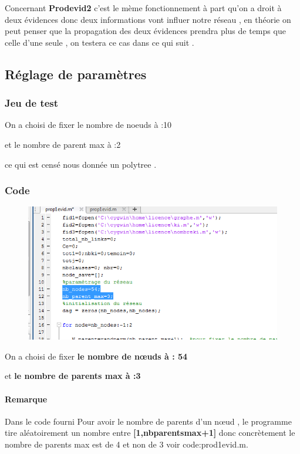 \documentclass[12pt,a4paper,oneside]{book}
\begin{document}
	 Concernant \textbf{Prodevid2} c'est le mème fonctionnement à part qu'on a droit à deux évidences donc deux informations vont influer notre réseau , en théorie  on peut penser que la propagation des deux évidences prendra plus de temps que celle d'une seule , on testera ce cas dans ce qui suit .
	 
	
	\subsection{Réglage de paramètres}
	\subsubsection{Jeu de test}
	On a choisi de fixer le nombre de noeuds à :10
	
	et le nombre de parent max à :2 
	
	ce qui est censé nous donnée un polytree .
	\subsubsection{Code}
	
    	\begin{figure}[h]
		\centering
		\includegraphics[scale=0.7]{screens/prodevid1code.png}
		\label{labelname}%
		\end{figure}
	
	On a choisi de fixer \textbf{le nombre de nœuds à : 54}
	
	et \textbf{le nombre de parents max à :3 }
	
   \paragraph{Remarque}
   Dans le code fourni Pour avoir le nombre de parents d'un nœud , le programme tire aléatoirement un nombre entre \textbf{[1,nbparentsmax+1]} donc concrètement  le nombre de parents max est de 4 et non de 3  voir code:prod1evid.m.
   
\end{document}
